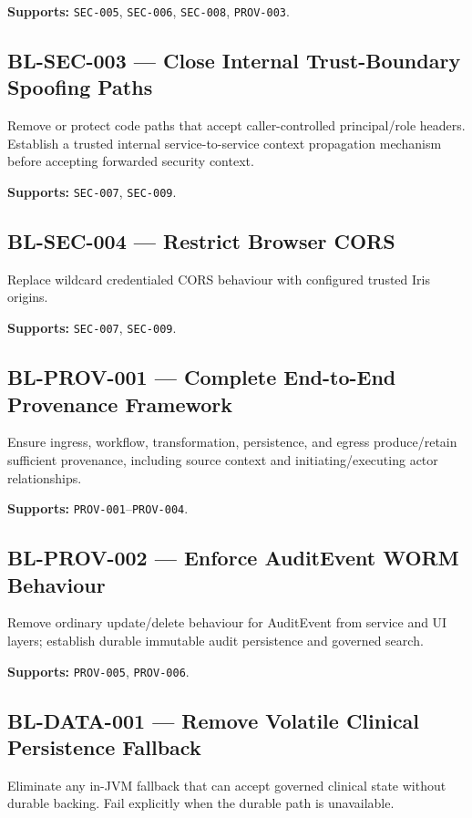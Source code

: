 \textbf{Supports:} \texttt{SEC-005}, \texttt{SEC-006}, \texttt{SEC-008}, \texttt{PROV-003}.

\subsection{BL-SEC-003 --- Close Internal Trust-Boundary Spoofing Paths}
Remove or protect code paths that accept caller-controlled principal/role headers. Establish a trusted internal service-to-service context propagation mechanism before accepting forwarded security context.

\textbf{Supports:} \texttt{SEC-007}, \texttt{SEC-009}.

\subsection{BL-SEC-004 --- Restrict Browser CORS}
Replace wildcard credentialed CORS behaviour with configured trusted Iris origins.

\textbf{Supports:} \texttt{SEC-007}, \texttt{SEC-009}.

\subsection{BL-PROV-001 --- Complete End-to-End Provenance Framework}
Ensure ingress, workflow, transformation, persistence, and egress produce/retain sufficient provenance, including source context and initiating/executing actor relationships.

\textbf{Supports:} \texttt{PROV-001}--\texttt{PROV-004}.

\subsection{BL-PROV-002 --- Enforce AuditEvent WORM Behaviour}
Remove ordinary update/delete behaviour for AuditEvent from service and UI layers; establish durable immutable audit persistence and governed search.

\textbf{Supports:} \texttt{PROV-005}, \texttt{PROV-006}.

\subsection{BL-DATA-001 --- Remove Volatile Clinical Persistence Fallback}
Eliminate any in-JVM fallback that can accept governed clinical state without durable backing. Fail explicitly when the durable path is unavailable.

